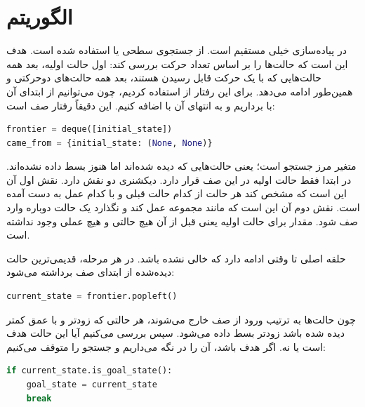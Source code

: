 \documentclass[10.5pt]{exam}
\begin{document}
\section{الگوریتم }
در
پیاده‌سازی
خیلی مستقیم است. از جستجوی سطحی یا
استفاده شده است. هدف
این است که حالت‌ها را بر اساس تعداد حرکت بررسی کند: اول حالت اولیه، بعد همه حالت‌هایی که با یک حرکت قابل رسیدن هستند، بعد همه حالت‌های دوحرکتی و همین‌طور ادامه می‌دهد. برای این رفتار از
استفاده کردیم، چون می‌توانیم از ابتدای آن با
برداریم و به انتهای آن با
اضافه کنیم. این دقیقاً رفتار صف
است:

\begin{latin}
\begin{lstlisting}[language=Python]
frontier = deque([initial_state])
came_from = {initial_state: (None, None)}
\end{lstlisting}
\end{latin}

متغیر
مرز جستجو است؛ یعنی حالت‌هایی که دیده شده‌اند اما هنوز بسط داده نشده‌اند. در ابتدا فقط حالت اولیه در این صف قرار دارد. دیکشنری
دو نقش دارد. نقش اول آن این است که مشخص کند هر حالت از کدام حالت قبلی و با کدام عمل به دست آمده است. نقش دوم آن این است که مانند مجموعه
عمل کند و نگذارد یک حالت دوباره وارد صف شود. مقدار
برای حالت اولیه یعنی قبل از آن هیچ حالتی و هیچ عملی وجود نداشته است.

حلقه اصلی تا وقتی ادامه دارد که
خالی نشده باشد. در هر مرحله، قدیمی‌ترین حالت دیده‌شده از ابتدای صف برداشته می‌شود:

\begin{latin}
\begin{lstlisting}[language=Python]
current_state = frontier.popleft()
\end{lstlisting}
\end{latin}

چون حالت‌ها به ترتیب ورود از صف خارج می‌شوند، هر حالتی که زودتر و با عمق کمتر دیده شده باشد زودتر بسط داده می‌شود. سپس بررسی می‌کنیم آیا این حالت هدف است یا نه. اگر هدف باشد، آن را در
نگه می‌داریم و جستجو را متوقف می‌کنیم:

\begin{latin}
\begin{lstlisting}[language=Python]
if current_state.is_goal_state():
    goal_state = current_state
    break
\end{lstlisting}
\end{latin}
\end{document}
